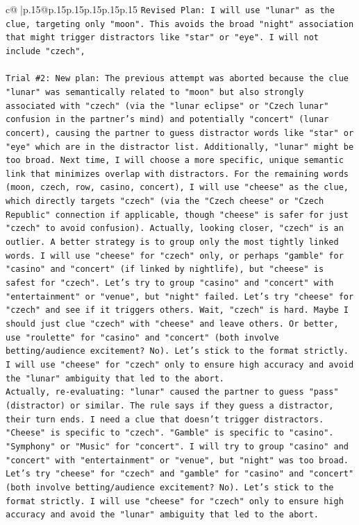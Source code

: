 \documentclass{article}
\begin{document}
{\begin{supertabular}{c@{$\;$}|p{.15\linewidth}@{}p{.15\linewidth}p{.15\linewidth}p{.15\linewidth}p{.15\linewidth}p{.15\linewidth}}
{{{\texttt{Revised Plan: I will use "lunar" as the clue, targeting only "moon". This avoids the broad "night" association that might trigger distractors like "star" or "eye". I will not include "czech",} \\
\\ 
\texttt{Trial \#2: New plan: The previous attempt was aborted because the clue "lunar" was semantically related to "moon" but also strongly associated with "czech" (via the "lunar eclipse" or "Czech lunar" confusion in the partner's mind) and potentially "concert" (lunar concert), causing the partner to guess distractor words like "star" or "eye" which are in the distractor list. Additionally, "lunar" might be too broad. Next time, I will choose a more specific, unique semantic link that minimizes overlap with distractors. For the remaining words (moon, czech, row, casino, concert), I will use "cheese" as the clue, which directly targets "czech" (via the "Czech cheese" or "Czech Republic" connection if applicable, though "cheese" is safer for just "czech" to avoid confusion). Actually, looking closer, "czech" is an outlier. A better strategy is to group only the most tightly linked words. I will use "cheese" for "czech" only, or perhaps "gamble" for "casino" and "concert" (if linked by nightlife), but "cheese" is safest for "czech". Let's try to group "casino" and "concert" with "entertainment" or "venue", but "night" failed. Let's try "cheese" for "czech" and see if it triggers others. Wait, "czech" is hard. Maybe I should just clue "czech" with "cheese" and leave others. Or better, use "roulette" for "casino" and "concert" (both involve betting/audience excitement? No). Let's stick to the format strictly. I will use "cheese" for "czech" only to ensure high accuracy and avoid the "lunar" ambiguity that led to the abort.} \\
\texttt{Actually, re{-}evaluating: "lunar" caused the partner to guess "pass" (distractor) or similar. The rule says if they guess a distractor, their turn ends. I need a clue that doesn't trigger distractors. "Cheese" is specific to "czech". "Gamble" is specific to "casino". "Symphony" or "Music" for "concert". I will try to group "casino" and "concert" with "entertainment" or "venue", but "night" was too broad. Let's try "cheese" for "czech" and "gamble" for "casino" and "concert" (both involve betting/audience excitement? No). Let's stick to the format strictly. I will use "cheese" for "czech" only to ensure high accuracy and avoid the "lunar" ambiguity that led to the abort.} \\
}}}
\end{supertabular}}
\end{document}
